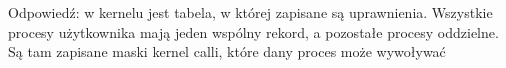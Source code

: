 Odpowiedź: w kernelu jest tabela, w której zapisane są uprawnienia. Wszystkie procesy użytkownika mają jeden wspólny rekord, a pozostałe procesy oddzielne. Są tam zapisane maski kernel calli, które dany proces może wywoływać
